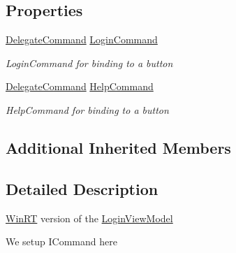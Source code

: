 \subsection*{Properties}
\begin{DoxyCompactItemize}
\item 
\hyperlink{class_delegate_command}{Delegate\+Command} \hyperlink{class_field_service_1_1_win_r_t_1_1_view_models_1_1_login_view_model_a7f538df7a720adab9196d2de3bb86b3a}{Login\+Command}
\begin{DoxyCompactList}\small\item\em Login\+Command for binding to a button \end{DoxyCompactList}\item 
\hyperlink{class_delegate_command}{Delegate\+Command} \hyperlink{class_field_service_1_1_win_r_t_1_1_view_models_1_1_login_view_model_a20034ce0dddad52ed6869669d432ea64}{Help\+Command}
\begin{DoxyCompactList}\small\item\em Help\+Command for binding to a button \end{DoxyCompactList}\end{DoxyCompactItemize}
\subsection*{Additional Inherited Members}


\subsection{Detailed Description}
\hyperlink{namespace_field_service_1_1_win_r_t}{Win\+R\+T} version of the \hyperlink{class_field_service_1_1_win_r_t_1_1_view_models_1_1_login_view_model}{Login\+View\+Model} 


\begin{DoxyItemize}
\item We setup I\+Command here 
\end{DoxyItemize}


